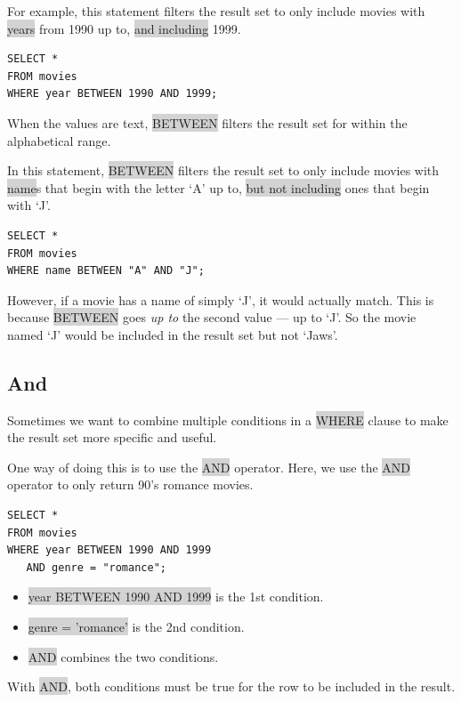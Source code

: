 \documentclass[11pt]{article}
\begin{document}
{{For example, this statement filters the result set to only include movies with \colorbox{lightgray}{years} from 1990 up to, \colorbox{lightgray}{and including} 1999.
\begin{lstlisting}
SELECT *
FROM movies
WHERE year BETWEEN 1990 AND 1999;
\end{lstlisting}
When the values are text, \colorbox{lightgray}{BETWEEN} filters the result set for within the alphabetical range.

In this statement, \colorbox{lightgray}{BETWEEN} filters the result set to only include movies with \colorbox{lightgray}{name}s that begin with the letter ‘A’ up to, \colorbox{lightgray}{but not including} ones that begin with ‘J’.
\begin{lstlisting}
SELECT *
FROM movies
WHERE name BETWEEN "A" AND "J";
\end{lstlisting}
However, if a movie has a name of simply ‘J’, it would actually match. This is because \colorbox{lightgray}{BETWEEN} goes \textit{up to} the second value — up to ‘J’. So the movie named ‘J’ would be included in the result set but not ‘Jaws’.

\subsection{And}
Sometimes we want to combine multiple conditions in a \colorbox{lightgray}{WHERE} clause to make the result set more specific and useful.

One way of doing this is to use the \colorbox{lightgray}{AND} operator. Here, we use the \colorbox{lightgray}{AND} operator to only return 90’s romance movies.
\begin{lstlisting}
SELECT * 
FROM movies
WHERE year BETWEEN 1990 AND 1999
   AND genre = "romance";
\end{lstlisting}
\begin{itemize}[leftmargin = *]
\item \colorbox{lightgray}{year BETWEEN 1990 AND 1999} is the 1st condition.
\item \colorbox{lightgray}{genre = 'romance'} is the 2nd condition.
\item \colorbox{lightgray}{AND} combines the two conditions.
\end{itemize}

With \colorbox{lightgray}{AND}, both conditions must be true for the row to be included in the result.

}}
\end{document}
